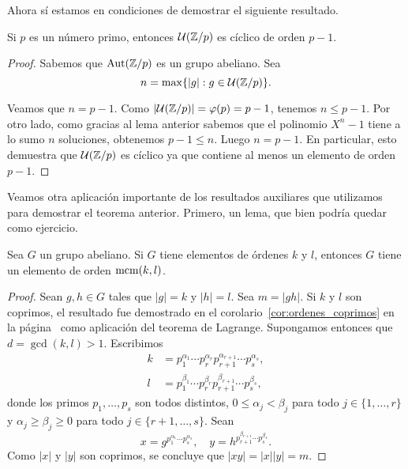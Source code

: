 Ahora sí estamos en condiciones de demostrar el siguiente resultado. 

\begin{theorem}
Si $p$ es un número primo, entonces $\mathcal{U}(\mathbb{Z}/p)$ es cíclico de orden $p-1$. 
\end{theorem}

\begin{proof}
Sabemos que $\operatorname{Aut}(\mathbb{Z}/p)$ es un grupo abeliano. Sea 
\[
n=\max\{|g|:g\in\mathcal{U}(\mathbb{Z}/p)\}.
\] 

Veamos que $n=p-1$. Como $|\mathcal{U}(\mathbb{Z}/p)|=\varphi(p)=p-1$, tenemos $n\leq p-1$. Por otro lado, como gracias al lema anterior sabemos que el polinomio $X^n-1$ tiene a lo sumo $n$ soluciones, obtenemos $p-1\leq n$. Luego $n=p-1$. En particular, esto demuestra que $\mathcal{U}(\mathbb{Z}/p)$ es cíclico ya que contiene al menos un elemento de orden $p-1$.  
\end{proof}

Veamos otra aplicación importante de los resultados auxiliares que utilizamos para demostrar el teorema anterior. Primero, un lema, que bien podría quedar como ejercicio.

\begin{lemma}
Sea $G$ un grupo abeliano. Si $G$ tiene elementos de órdenes $k$ y $l$, entonces $G$ tiene un elemento de orden $\operatorname{mcm}(k,l)$. 
\end{lemma}

\begin{proof}
Sean $g,h\in G$ tales que $|g|=k$ y $|h|=l$. Sea 
$m=|gh|$. Si $k$ y $l$ son coprimos, 
el resultado fue demostrado en el corolario~\ref{cor:ordenes_coprimos} en la página~\pageref{cor:ordenes_coprimos} como aplicación del teorema de Lagrange. 
Supongamos entonces que $d=\gcd(k,l)>1$. Escribimos
\begin{align*}
k&=p_1^{\alpha_1}\cdots p_r^{\alpha_r} p_{r+1}^{\alpha_{r+1}}\cdots p_s^{\alpha_s},\\
l&=p_1^{\beta_1}\cdots p_r^{\beta_r} p_{r+1}^{\beta_{r+1}}\cdots p_s^{\beta_s},
\end{align*}
donde los primos $p_1,\dots,p_s$ son todos distintos, $0\leq\alpha_j<\beta_j$ para todo $j\in\{1,\dots,r\}$ y $\alpha_j\geq\beta_j\geq0$ para todo $j\in\{r+1,\dots,s\}$. Sean
\[
x=g^{p_1^{\alpha_1}\cdots p_s^{\alpha_s}},
\quad
y=h^{p_{r+1}^{\beta_{r+1}}\cdots p_s^{\beta_s}}.
\]
Como $|x|$ y $|y|$ son coprimos, se concluye que
$|xy|=|x||y|=m$.
\end{proof}

